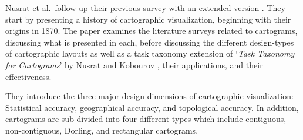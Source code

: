 %
%
%



Nusrat et al.\ follow-up their previous survey with an extended version \cite{nusrat2016state}.
They start by presenting a history of cartographic visualization, beginning with their origins in 1870. The paper examines the literature surveys related to cartograms, discussing what is presented in each, before discussing the different design-types of cartographic layouts as well as a task taxonomy extension of `\textit{Task Taxonomy for Cartograms}' by Nusrat and Kobourov \cite{nusrat2015task}, their applications, and their effectiveness.

They introduce the three major design dimensions of cartographic visualization:
Statistical accuracy, geographical accuracy, and topological accuracy. In addition, cartograms are sub-divided into four different types which include contiguous, non-contiguous, Dorling, and rectangular cartograms.

